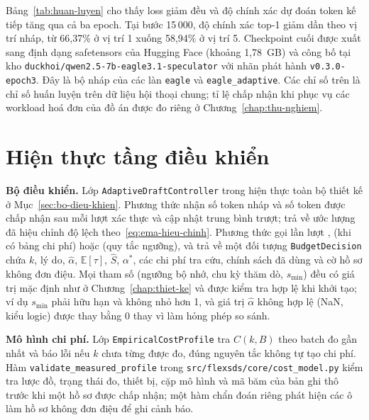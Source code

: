 Bảng~\ref{tab:huan-luyen} cho thấy loss giảm đều và độ chính xác dự đoán token kế tiếp tăng qua cả ba epoch. Tại bước 15\,000, độ chính xác top-1 giảm dần theo vị trí nháp, từ 66,37\% ở vị trí 1 xuống 58,94\% ở vị trí 5. Checkpoint cuối được xuất sang định dạng safetensors của Hugging Face (khoảng 1,78~GB) và công bố tại kho \texttt{duckhoi/qwen2.5-7b-eagle3.1-speculator} với nhãn phát hành \texttt{v0.3.0-epoch3}. Đây là bộ nháp của các làn \texttt{eagle} và \texttt{eagle\_adaptive}. Các chỉ số trên là chỉ số huấn luyện trên dữ liệu hội thoại chung; tỉ lệ chấp nhận khi phục vụ các workload hoá đơn của đồ án được đo riêng ở Chương~\ref{chap:thu-nghiem}.

\section{Hiện thực tầng điều khiển}
\label{sec:ht-dieu-khien}

\textbf{Bộ điều khiển.} Lớp \texttt{AdaptiveDraftController} trong  hiện thực toàn bộ thiết kế ở Mục~\ref{sec:bo-dieu-khien}. Phương thức  nhận số token nháp và số token được chấp nhận sau mỗi lượt xác thực và cập nhật trung bình trượt;  trả về ước lượng đã hiệu chỉnh độ lệch theo~\eqref{eq:ema-hieu-chinh}. Phương thức  gọi lần lượt ,  (khi có bảng chi phí) hoặc  (quy tắc ngưỡng), và trả về một đối tượng \texttt{BudgetDecision} chứa $k$, lý do, $\hat{\alpha}$, $\mathbb{E}[\tau]$, $\hat{S}$, $\alpha^\ast$, các chi phí tra cứu, chính sách đã dùng và cờ hồ sơ không đơn điệu. Mọi tham số (ngưỡng bộ nhớ, chu kỳ thăm dò, $s_{\min}$) đều có giá trị mặc định như ở Chương~\ref{chap:thiet-ke} và được kiểm tra hợp lệ khi khởi tạo; ví dụ $s_{\min}$ phải hữu hạn và không nhỏ hơn 1, và giá trị $\hat{\alpha}$ không hợp lệ (NaN, kiểu logic) được thay bằng 0 thay vì làm hỏng phép so sánh.

\textbf{Mô hình chi phí.} Lớp \texttt{EmpiricalCostProfile} tra $C(k, B)$ theo batch đo gần nhất và báo lỗi nếu $k$ chưa từng được đo, đúng nguyên tắc không tự tạo chi phí. Hàm \texttt{validate\_measured\_profile} trong \texttt{src/flexsds/core/cost\_model.py} kiểm tra lược đồ, trạng thái đo, thiết bị, cặp mô hình và mã băm của bản ghi thô trước khi một hồ sơ được chấp nhận; một hàm chẩn đoán riêng phát hiện các ô làm hồ sơ không đơn điệu để ghi cảnh báo.

